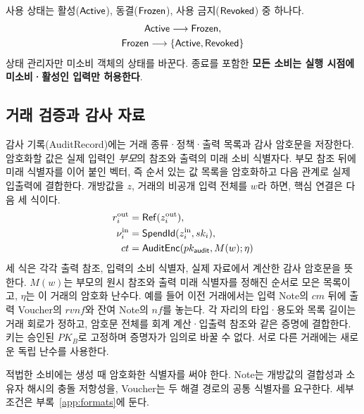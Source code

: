 사용 상태는 활성($\textsf{Active}$), 동결($\textsf{Frozen}$),
사용 금지($\textsf{Revoked}$) 중 하나다.
\begin{equation}
 \begin{gathered}
 \textsf{Active}\longrightarrow\textsf{Frozen},\\
 \textsf{Frozen}\longrightarrow\{\textsf{Active},\textsf{Revoked}\}
 \end{gathered}
 \label{eq:status}
\end{equation}
상태 관리자만 미소비 객체의 상태를 바꾼다. 종료를 포함한
\textbf{\mbox{모든} 소비는 실행 시점에 미소비·활성인 입력만 허용한다}.

\subsection{거래 검증과 감사 자료}
\label{sec:transitions}
\label{sec:binding-interface}

감사 기록(AuditRecord)에는 거래 종류·정책·출력 목록과 감사 암호문을 저장한다.
암호화할 값은 실제 입력인 \emph{부모}의 참조와 출력의 미래 소비 식별자다.
부모 참조 뒤에 미래 식별자를 이어 붙인 벡터, 즉 순서 있는 값 목록을
암호화하고 다음 관계로 실제 입출력에 결합한다.
개방값을 $z$, 거래의 비공개 입력 전체를 $w$라 하면,
핵심 연결은 다음 세 식이다.
\begin{equation}
 \begin{aligned}
 r_i^{\rm out}&=\mathsf{Ref}(z_i^{\rm out}),\\
 \nu_i^{\rm in}&=\mathsf{SpendId}(z_i^{\rm in},sk_i),\\
 ct&=\mathsf{AuditEnc}(pk_{\mathsf{audit}},M(w);\eta)
 \end{aligned}
 \label{eq:audit-binding-interface}
\end{equation}
세 식은 각각 출력 참조, 입력의 소비 식별자, 실제 자료에서
계산한 감사 암호문을 뜻한다.
$M(w)$는 부모의 원시 참조와 출력 미래 식별자를 정해진 순서로
모은 목록이고, $\eta$는 이 거래의 암호화 난수다.
예를 들어 이전 거래에서는 입력 Note의 $cm$ 뒤에
출력 Voucher의 $rvnf$와 잔여 Note의 $nf$를 놓는다.
각 자리의 타입·용도와 목록 길이는 거래 회로가 정하고,
암호문 전체를 회계 계산·입출력 참조와 같은 증명에 결합한다.
키는 승인된 $PK_B$로 고정하며 증명자가 임의로 바꿀 수 없다.
서로 다른 거래에는 새로운 독립 난수를 사용한다.

적법한 소비에는 생성 때 암호화한 식별자를 써야 한다.
Note는 개방값의 결합성과 소유자 해시의 충돌 저항성을,
Voucher는 두 해결 경로의 공통 식별자를 요구한다.
세부 조건은 부록~\ref{app:formats}에 둔다.
